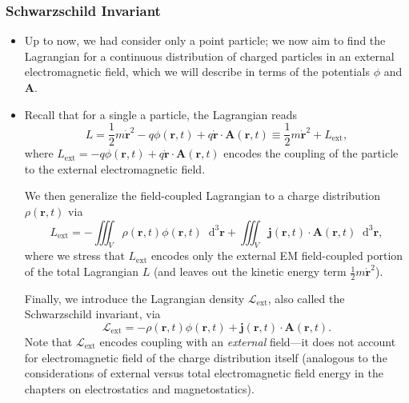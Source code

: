 \documentclass[11pt, a4paper]{article}
\newcommand{\diff}{\mathop{}\!\mathrm{d}} %
\newcommand{\dr}{\diff^{3} \r}  %
\renewcommand{\L}{\mathcal{L}}  %
\renewcommand{\vec}[1]{\bm{#1}} %
\newcommand{\bdot}[1]{\dot{\vec{#1}}}
\renewcommand{\r}{\vec{r}}
\newcommand{\A}{\vec{A}} %
\renewcommand{\j}{\vec{j}}  %
\begin{document}
\subsubsection{Schwarzschild Invariant}
\begin{itemize}
	\item Up to now, we had consider only a point particle; we now aim to find the Lagrangian for a continuous distribution of charged particles in an external electromagnetic field, which we will describe in terms of the potentials $ \phi $ and $ \A $. 
	
	\item Recall that for a single a particle, the Lagrangian reads
	\begin{equation*}
		L = \frac{1}{2}m\bdot{r}^{2} - q \phi(\r, t) + q \bdot{r}\cdot \A(\r, t) \equiv \frac{1}{2}m \dot{\vec{r}}^{2} + L_{\text{ext}},
	\end{equation*}
    where $ L_{\text{ext}} = - q \phi(\r, t) + q \bdot{r}\cdot \A(\r, t) $ encodes the coupling of the particle to the external electromagnetic field. 

    We then generalize the field-coupled Lagrangian to a charge distribution $ \rho(\r, t) $ via
	\begin{equation*}
		L_{\text{ext}} = - \iiint_{V}\rho(\r, t) \phi(\r, t) \dr + \iiint_{V}\j(\r, t) \cdot \A(\r, t)\dr,
	\end{equation*}
    where we stress that $ L_{\text{ext}} $ encodes only the external EM field-coupled portion of the total Lagrangian $ L $ (and leaves out the kinetic energy term $ \frac{1}{2}m \dot{\vec{r}}^{2} $).
    
    Finally, we introduce the Lagrangian density $ \L_{\text{ext}} $, also called the Schwarzschild invariant, via
	\begin{equation*}
		\L_{\text{ext}} = - \rho(\r, t) \phi(\r, t) + \j(\r, t)\cdot \A(\r, t).
	\end{equation*}
    Note that $ \L_{\text{ext}} $ encodes coupling with an \textit{external} field---it does not account for electromagnetic field of the charge distribution itself (analogous to the considerations of external versus total electromagnetic field energy in the chapters on electrostatics and magnetostatics).
	
\end{itemize}
\end{document}
